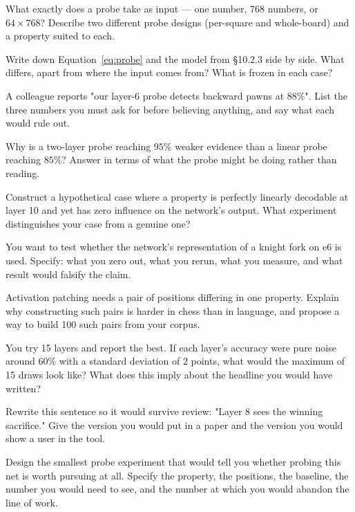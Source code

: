 \begin{exercises}

 What exactly does a probe take as input --- one number, 768
numbers, or $64\times768$? Describe two different probe designs (per-square and whole-board)
and a property suited to each.

 Write down Equation~\eqref{eq:probe} and the model from
§10.2.3 side by side. What differs, apart from where the input comes from? What is frozen in
each case?

 A colleague reports "our layer-6 probe detects backward
pawns at $88\%$". List the three numbers you must ask for before believing anything, and say
what each would rule out.

 Why is a two-layer probe reaching $95\%$ weaker evidence than
a linear probe reaching $85\%$? Answer in terms of what the probe might be doing rather than
reading.

 Construct a hypothetical case where a property is
perfectly linearly decodable at layer 10 and yet has zero influence on the network's output.
What experiment distinguishes your case from a genuine one?

 You want to test whether the network's
representation of a knight fork on e6 is used. Specify: what you zero out, what you rerun,
what you measure, and what result would falsify the claim.

 Activation patching needs a pair of positions differing in
one property. Explain why constructing such pairs is harder in chess than in language, and
propose a way to build 100 such pairs from your corpus.

 You try 15 layers and report the best. If each
layer's accuracy were pure noise around $60\%$ with a standard deviation of $2$ points, what
would the maximum of 15 draws look like? What does this imply about the headline you would
have written?

 Rewrite this sentence so it would survive review:
"Layer 8 sees the winning sacrifice." Give the version you would put in a paper and the
version you would show a user in the tool.

 Design the smallest probe experiment that
would tell you whether probing this net is worth pursuing at all. Specify the property, the
positions, the baseline, the number you would need to see, and the number at which you would
abandon the line of work.

\end{exercises}
